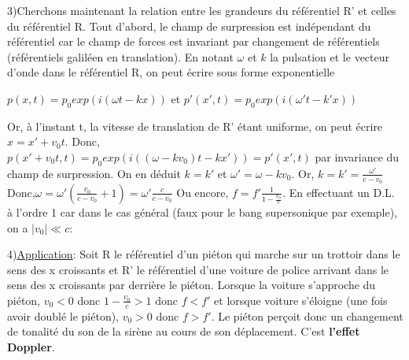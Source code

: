 \documentclass[a4paper, 12pt]{article}
\begin{document}
\begin{center}
\end{center}
3)Cherchons maintenant la relation entre les grandeurs du référentiel R' et celles du référentiel R.\newline \newline
Tout d'abord, le champ de surpression est indépendant du référentiel car le champ de forces est invariant par changement de référentiels (référentiels galiléen en translation). En notant $\omega$ et $k$ la pulsation et le vecteur d'onde dans le référentiel R, on peut écrire sous forme exponentielle
\begin{center}
$p(x,t)=p_0exp(i(\omega t-kx))$ et 
$p'(x',t)=p_0exp(i(\omega't-k'x))$
\end{center}
Or, à l'instant t, la vitesse de translation de R' étant uniforme, on peut écrire $x=x'+v_0t$.\newline \newline
Donc, $p(x'+v_0t,t)=p_0exp(i((\omega -kv_0)t-kx'))=p'(x',t)$ par invariance du champ de surpression.\newline \newline
On en déduit $k=k'$ et $\omega'=\omega -kv_0$. Or, $k=k'=\frac{\omega'}{c-v_0}$\newline
Donc,\quad$\omega=\omega'(\frac{v_0}{c-v_0}+1)=\omega'\frac{c}{c-v_0}$\newline \newline
Ou encore, $f=f'\frac{1}{1-\frac{v_0}{c}}$. En effectuant un D.L. à l'ordre 1 car dans le cas général (faux pour le bang supersonique par exemple), on a $|v_0|\ll c$:\newline
\begin{center}

\end{center}
4)\underline{Application}:\newline \newline
Soit R le référentiel d'un piéton qui marche sur un trottoir dans le sens des x croissants et R' le référentiel d'une voiture de police arrivant dans le sens des x croissants par derrière le piéton. Lorsque la voiture s'approche du piéton, $v_0<0$ donc $1-\frac{v_0}{c} > 1$ donc $f<f'$ et lorsque voiture s'éloigne (une fois avoir doublé le piéton), $v_0>0$ donc $f>f'$. Le piéton perçoit donc un changement de tonalité du son de la sirène au cours de son déplacement. C'est \textbf{l'effet Doppler}.
\end{document}
